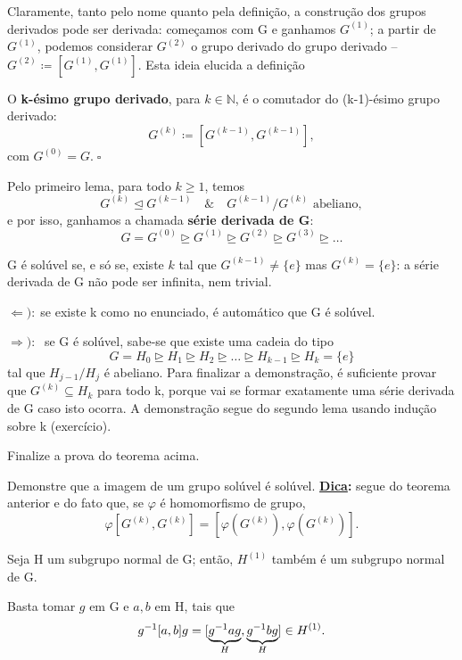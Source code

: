 \documentclass[../algebraIII_notes.tex]{subfiles}
\begin{document}
Claramente, tanto pelo nome quanto pela definição, a construção dos grupos derivados pode ser derivada: começamos com G e ganhamos \(G^{(1)}\); a partir de \(G^{(1)}\), podemos considerar \(G^{(2)}\) o grupo derivado do grupo derivado -- \(G^{(2)}\coloneqq [G^{(1)}, G^{(1)}]\). Esta ideia elucida a definição
\begin{def*}
	O \textbf{k-ésimo grupo derivado}, para \(k\in \mathbb{N}\), é o comutador do (k-1)-ésimo grupo derivado:
	\[
		G^{(k)}\coloneqq [G^{(k-1)}, G^{(k-1)}],
	\]
	com \(G^{(0)}=G.\; \square\)
\end{def*}
Pelo primeiro lema, para todo \(k\geq 1\), temos
\[
	G^{(k)}\trianglelefteq G^{(k-1)} \quad\&\quad G^{(k-1)}/G^{(k)} \text{ abeliano},
\]
e por isso, ganhamos a chamada \textbf{série derivada de G}:
\[
	G = G^{(0)}\trianglerighteq G^{(1)}\trianglerighteq G^{(2)}\trianglerighteq G^{(3)}\trianglerighteq \dotsc
\]
\begin{theorem*}
	G é solúvel se, e só se, existe \(k\) tal que \(G^{(k-1)}\neq \{e\}\) mas \(G^{(k)}=\{e\}\): a série derivada de G não pode ser infinita, nem trivial.
\end{theorem*}
\begin{proof*}
	\(\Leftarrow ):\;\)se existe k como no enunciado, é automático que G é solúvel.

	\(\Rightarrow):\;\) se G é solúvel, sabe-se que existe uma cadeia do tipo
	\[
		G=H_{0}\trianglerighteq H_1\trianglerighteq H_2\trianglerighteq \dotsc \trianglerighteq H_{k-1}\trianglerighteq H_{k}=\{e\}
	\]
	tal que \(H_{j-1}/H_{j}\) é abeliano. Para finalizar a demonstração, é suficiente provar que \(G^{(k)}\subseteq H_{k}\) para todo k, porque vai se formar exatamente uma série derivada de G caso isto ocorra.
	A demonstração segue do segundo lema usando indução sobre k (exercício). \qedsymbol
\end{proof*}
\begin{exr}
	Finalize a prova do teorema acima.
\end{exr}
\begin{exr}
	Demonstre que a imagem de um grupo solúvel é solúvel. \textbf{\underline{Dica}:} segue do teorema anterior e do fato que, se \(\varphi \) é homomorfismo de grupo,
	\[
		\varphi [G^{(k)}, G^{(k)}]=[\varphi (G^{(k)}), \varphi (G^{(k)})].
	\]
\end{exr}
\begin{lemma*}
	Seja H um subgrupo normal de G; então, \(H^{(1)}\) também é um subgrupo normal de G.
\end{lemma*}
\begin{proof*}
	Basta tomar \(g\) em G e \(a, b\) em H, tais que
	\[
		g^{-1}[a, b]g = [\underbrace{g^{-1}ag}_{\mathclap{H}}, \underbrace{g^{-1}bg}_{\mathclap{H}}]\in H^{(1)}.
	\]
\end{proof*}
\end{document}
